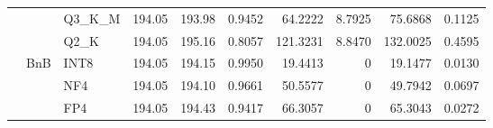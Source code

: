 \begin{table}[t]
{\begin{tabular}{ll l rrrrrrr}
 &  & Q3\_K\_M & 194.05 & 193.98 & \cellcolor{red!18} 0.9452 & \cellcolor{red!18} 64.2222 & 8.7925 & \cellcolor{red!18} 75.6868 & \cellcolor{red!18} 0.1125 \\
 &  & Q2\_K & 194.05 & 195.16 & \cellcolor{red!18} 0.8057 & \cellcolor{red!18} 121.3231 & 8.8470 & \cellcolor{red!18} 132.0025 & \cellcolor{red!18} 0.4595 \\
 & BnB & INT8 & 194.05 & 194.15 & 0.9950 & 19.4413 & \cellcolor{cyan!12} $0$ & 19.1477 & 0.0130 \\
 &  & NF4 & 194.05 & 194.10 & 0.9661 & 50.5577 & \cellcolor{cyan!12} $0$ & 49.7942 & 0.0697 \\
 &  & FP4 & 194.05 & 194.43 & \cellcolor{red!18} 0.9417 & \cellcolor{red!18} 66.3057 & \cellcolor{cyan!12} $0$ & \cellcolor{red!18} 65.3043 & \cellcolor{red!18} 0.0272 \\
\bottomrule
\end{tabular}}
\end{table}